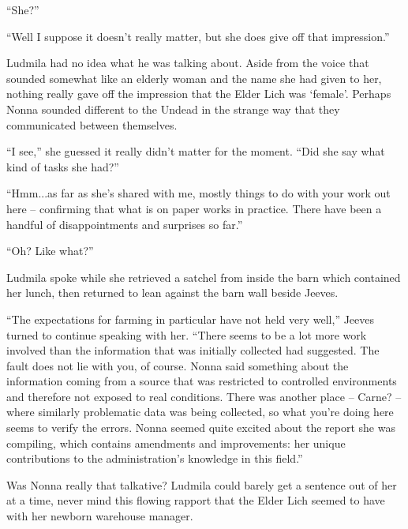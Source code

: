  

“She?”

 

“Well I suppose it doesn’t really matter, but she does give off that impression.”

 

Ludmila had no idea what he was talking about. Aside from the voice that sounded somewhat like an elderly woman and the name she had given to her, nothing really gave off the impression that the Elder Lich was ‘female’. Perhaps Nonna sounded different to the Undead in the strange way that they communicated between themselves.

 

“I see,” she guessed it really didn’t matter for the moment. “Did she say what kind of tasks she had?”

 

“Hmm...as far as she’s shared with me, mostly things to do with your work out here – confirming that what is on paper works in practice. There have been a handful of disappointments and surprises so far.”

 

“Oh? Like what?”

 

Ludmila spoke while she retrieved a satchel from inside the barn which contained her lunch, then returned to lean against the barn wall beside Jeeves.

 

“The expectations for farming in particular have not held very well,” Jeeves turned to continue speaking with her. “There seems to be a lot more work involved than the information that was initially collected had suggested. The fault does not lie with you, of course. Nonna said something about the information coming from a source that was restricted to controlled environments and therefore not exposed to real conditions. There was another place – Carne? – where similarly problematic data was being collected, so what you’re doing here seems to verify the errors. Nonna seemed quite excited about the report she was compiling, which contains amendments and improvements: her unique contributions to the administration’s knowledge in this field.”

 

Was Nonna really that talkative? Ludmila could barely get a sentence out of her at a time, never mind this flowing rapport that the Elder Lich seemed to have with her newborn warehouse manager.

 

